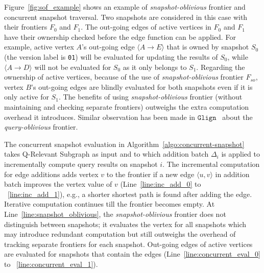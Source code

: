 Figure~\ref{fig:sof_example} shows an example of \textit{snapshot-oblivious} frontier and concurrent snapshot traversal. Two snapshots are considered in this case with their frontiers $F_0$ and $F_1$. 
The out-going edges of active vertices in $F_0$ and $F_1$ have their ownership checked before the edge function can be applied.
For example, active vertex $A$'s out-going edge $\langle A\rightarrow E\rangle$ that is owned by snapshot $S_0$ (the version label is \texttt{01}) will be evaluated for updating the results of $S_0$, while $\langle A\rightarrow D\rangle$ will not be evaluated for $S_0$ as it only belongs to $S_1$.
Regarding the ownership of active vertices, because of the use of \textit{snapshot-oblivious} frontier $F_{so}$, vertex $B$'s out-going edges are blindly evaluated for both snapshots even if it is only active for $S_1$. 
The benefits of using \textit{snapshot-oblivious} frontier (without maintaining and checking separate frontiers) outweighs the extra computation overhead it introduces. Similar observation has been made in $\texttt{Glign}$~\cite{yin2022glign} about the \textit{query-oblivious} frontier.

The concurrent snapshot evaluation in Algorithm~\ref{algo:concurrent-snapshot} takes Q-Relevant Subgraph as input and to which addition batch $\Delta_i$ is applied to incrementally compute query results on snapshot $i$. The incremental computation for edge additions adds vertex $v$ to the frontier if a new edge $\langle u,v\rangle$ in addition batch improves the vertex value of $v$ (Line~\ref{line:inc_add_0} to ~\ref{line:inc_add_1}), e.g., a shorter shortest path is found after adding the edge.
Iterative computation continues till the frontier becomes empty. At Line~\ref{line:snapshot_oblivious}, the \textit{snapshot-oblivious} frontier does not distinguish between snapshots; it evaluates the vertex for all snapshots which may introduce redundant computation but still outweighs the overhead of tracking separate frontiers for each snapshot. Out-going edges of active vertices are evaluated for snapshots that contain the edges (Line~\ref{line:concurrent_eval_0} to ~\ref{line:concurrent_eval_1}). 

